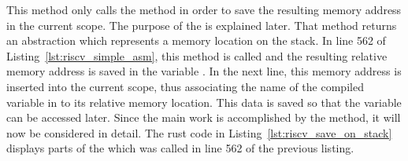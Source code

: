 
This method only calls the  method in order to save the resulting memory address in the current scope.
The purpose of the  is explained later.
That method returns an abstraction which represents a memory location on the stack.
In line 562 of Listing~\ref{lst:riscv_simple_asm}, this method is called and the resulting relative memory address is saved in the variable .
In the next line, this memory address is inserted into the current scope,
thus associating the name of the compiled variable in to its relative memory location.
This data is saved so that the variable can be accessed later.
Since the main work is accomplished by the  method, it will now be considered in detail.
The rust code in Listing~\ref{lst:riscv_save_on_stack} displays parts of the  which was called in line 562 of the previous listing.


